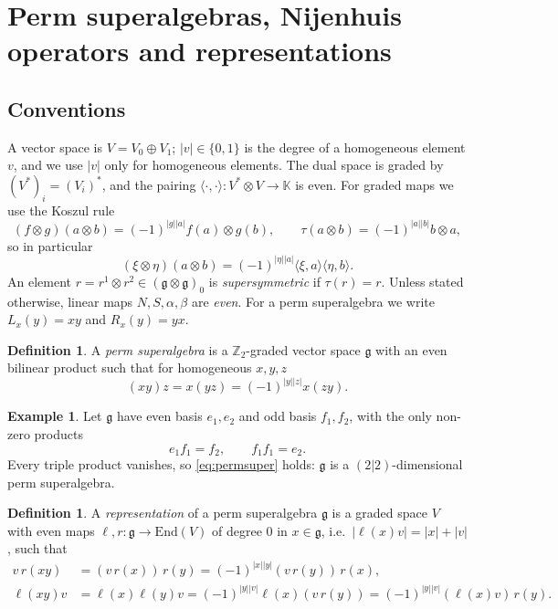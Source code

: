 \documentclass[11pt]{article}
\theoremstyle{definition}
\newtheorem{definition}[theorem]{Definition}
\newtheorem{example}[theorem]{Example}
\newcommand{\g}{\mathfrak{g}}
\newcommand{\K}{\mathbb{K}}
\newcommand{\End}{\mathrm{End}}
\newcommand{\lr}[1]{\langle #1\rangle}
\begin{document}
\section{Perm superalgebras, Nijenhuis operators and representations}\label{sec:prelim}

\subsection{Conventions}
A vector space is $V=V_0\oplus V_1$; $|v|\in\{0,1\}$ is the degree of a homogeneous element $v$, and we use $|v|$ only for homogeneous elements. The dual space is graded by $(V^*)_i=(V_i)^*$, and the pairing $\lr{\cdot,\cdot}:V^*\otimes V\to\K$ is even. For graded maps we use the Koszul rule
\[
(f\otimes g)(a\otimes b)=(-1)^{|g||a|}f(a)\otimes g(b),
\qquad
\tau(a\otimes b)=(-1)^{|a||b|}b\otimes a,
\]
so in particular
\[
(\xi\otimes\eta)(a\otimes b)=(-1)^{|\eta||a|}\lr{\xi,a}\lr{\eta,b}.
\]
An element $r=r^1\otimes r^2\in(\g\otimes\g)_0$ is \emph{supersymmetric} if $\tau(r)=r$. Unless stated otherwise, linear maps $N,S,\alpha,\beta$ are \emph{even}. For a perm superalgebra we write $L_x(y)=xy$ and $R_x(y)=yx$.

\begin{definition}\label{def:permsuper}
A \emph{perm superalgebra} is a $\mathbb{Z}_2$-graded vector space $\g$ with an even bilinear product such that for homogeneous $x,y,z$
\begin{equation}\label{eq:permsuper}
(xy)z=x(yz)=(-1)^{|y||z|}x(zy).
\end{equation}
\end{definition}

\begin{example}\label{ex:22}
Let $\g$ have even basis $e_1,e_2$ and odd basis $f_1,f_2$, with the only non-zero products
\[
e_1f_1=f_2,\qquad f_1f_1=e_2.
\]
Every triple product vanishes, so \eqref{eq:permsuper} holds: $\g$ is a $(2|2)$-dimensional perm superalgebra.
\end{example}

\begin{definition}\label{def:rep}
A \emph{representation} of a perm superalgebra $\g$ is a graded space $V$ with even maps $\ell,r:\g\to\End(V)$ of degree $0$ in $x\in\g$, i.e.\ $|\ell(x)v|=|x|+|v|$, such that
\begin{align}
v\,r(xy)&=(v\,r(x))\,r(y)=(-1)^{|x||y|}(v\,r(y))\,r(x),\label{eq:rep1}\\
\ell(xy)v&=\ell(x)\ell(y)v=(-1)^{|y||v|}\ell(x)(v\,r(y))
=(-1)^{|y||v|}(\ell(x)v)\,r(y).\label{eq:rep2}
\end{align}
\end{definition}
\end{document}
